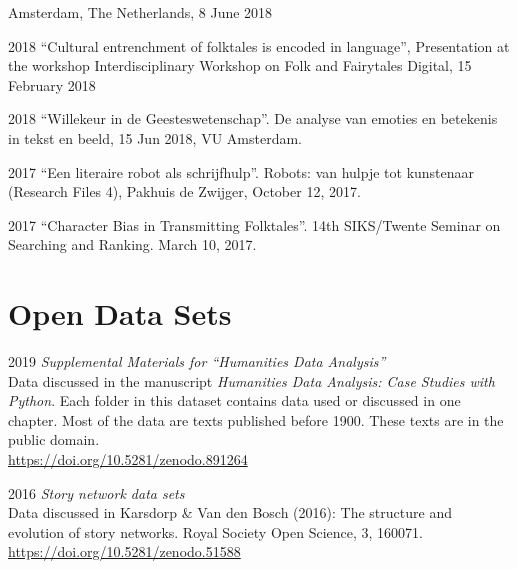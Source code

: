 \documentclass[12pt,letterpaper]{report}
\begin{document}
\begin{tablist}
  Amsterdam, The Netherlands, 8 June 2018
\item[2018] \tab{}``Cultural entrenchment of folktales is encoded in language'',
  Presentation at the workshop Interdisciplinary Workshop on Folk and Fairytales Digital,
  15 February 2018
\item[2018] \tab{}``Willekeur in de Geesteswetenschap''. De analyse van emoties en
  betekenis in tekst en beeld, 15 Jun 2018, VU Amsterdam.
\item[2017] \tab{}``Een literaire robot als schrijfhulp''. Robots: van hulpje tot
  kunstenaar (Research Files 4), Pakhuis de Zwijger, October 12, 2017. 
\item[2017] \tab{}``Character Bias in Transmitting Folktales''. 14th SIKS/Twente Seminar
  on Searching and Ranking. March 10, 2017. 
\end{tablist}

\section*{Open Data Sets}
\begin{tablist}
\item[2019] \tab{}\textit{Supplemental Materials for ``Humanities Data Analysis''}\\ Data
  discussed in the manuscript \textit{Humanities Data Analysis: Case Studies with Python}.
  Each folder in this dataset contains data used or discussed in one chapter. Most of the
  data are texts published before 1900. These texts are in the public domain. \\
  \url{https://doi.org/10.5281/zenodo.891264}
\item[2016] \tab{}\textit{Story network data sets} \\
  Data discussed in Karsdorp \& Van den Bosch (2016): The structure and evolution of story
  networks. Royal Society Open Science, 3, 160071.
  \url{https://doi.org/10.5281/zenodo.51588} 
\end{tablist}
\end{document}
